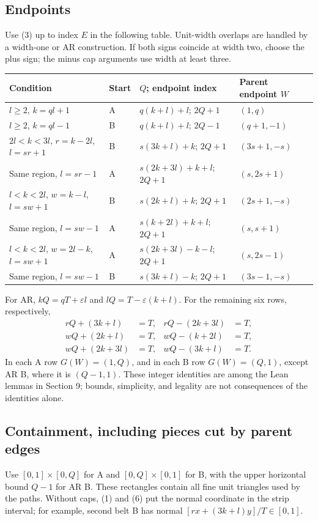 \documentclass[11pt]{amsart}
\begin{document}
\subsection{Endpoints}
Use (3) up to index $E$ in the following table. Unit-width overlaps are
handled by a width-one or AR construction. If both signs coincide at
width two, choose the plus sign; the minus cap arguments use width at
least three.
\begin{center}\scriptsize
\begin{tabular}{llll}\toprule
Condition & Start & $Q$; endpoint index & Parent endpoint $W$\\\midrule
$l\ge2$, $k=ql+1$ & A & $q(k+l)+l$; $2Q+1$ & $(1,q)$\\
$l\ge2$, $k=ql-1$ & B & $q(k+l)+l$; $2Q-1$ & $(q+1,-1)$\\
$2l<k<3l$, $r=k-2l$, $l=sr+1$ & B & $s(3k+l)+k$; $2Q+1$ & $(3s+1,-s)$\\
Same region, $l=sr-1$ & A & $s(2k+3l)+k+l$; $2Q+1$ & $(s,2s+1)$\\
$l<k<2l$, $w=k-l$, $l=sw+1$ & B & $s(2k+l)+k$; $2Q+1$ & $(2s+1,-s)$\\
Same region, $l=sw-1$ & A & $s(k+2l)+k+l$; $2Q+1$ & $(s,s+1)$\\
$l<k<2l$, $w=2l-k$, $l=sw+1$ & A & $s(2k+3l)-k-l$; $2Q+1$ & $(s,2s-1)$\\
Same region, $l=sw-1$ & B & $s(3k+l)-k$; $2Q+1$ & $(3s-1,-s)$\\\bottomrule
\end{tabular}\end{center}
For AR, $kQ=qT+\varepsilon l$ and $lQ=T-\varepsilon(k+l)$.
For the remaining six rows, respectively,
\begin{equation}\label{eq:6}
\begin{aligned}
rQ+(3k+l)&=T,&rQ-(2k+3l)&=T,\\
wQ+(2k+l)&=T,&wQ-(k+2l)&=T,\\
wQ+(2k+3l)&=T,&wQ-(3k+l)&=T.
\end{aligned}\tag{6}
\end{equation}
In each A row $G(W)=(1,Q)$, and in each B row $G(W)=(Q,1)$,
except AR B, where it is $(Q-1,1)$. These integer identities are among
the Lean lemmas in Section 9; bounds, simplicity, and legality are not
consequences of the identities alone.

\subsection{Containment, including pieces cut by parent edges}
Use $[0,1]\times[0,Q]$ for A and $[0,Q]\times[0,1]$ for B, with
the upper horizontal bound $Q-1$ for AR B. These rectangles contain
all fine unit triangles used by the paths. Without caps, (1) and (6)
put the normal coordinate in the strip interval; for example, second
belt B has normal $[rx+(3k+l)y]/T\in[0,1]$.
\end{document}

